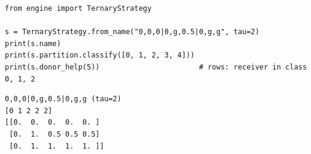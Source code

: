 \begin{lstlisting}[style=code]
from engine import TernaryStrategy

s = TernaryStrategy.from_name("0,0,0|0,g,0.5|0,g,g", tau=2)
print(s.name)
print(s.partition.classify([0, 1, 2, 3, 4]))
print(s.donor_help(5))                       # rows: receiver in class 0, 1, 2
\end{lstlisting}
\begin{lstlisting}[style=output]
0,0,0|0,g,0.5|0,g,g (tau=2)
[0 1 2 2 2]
[[0.  0.  0.  0.  0. ]
 [0.  1.  0.5 0.5 0.5]
 [0.  1.  1.  1.  1. ]]
\end{lstlisting}
